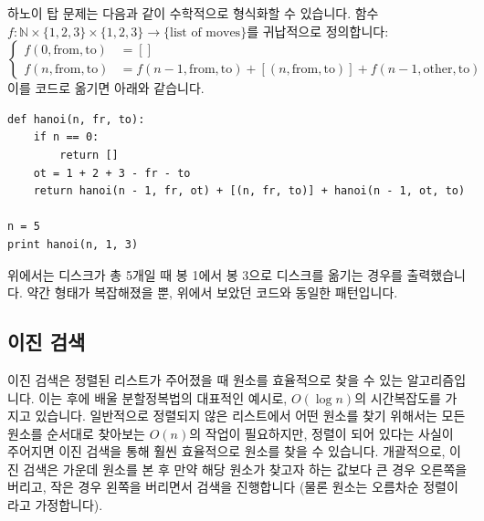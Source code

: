 \documentclass[../main.tex]{subfiles}
\begin{document}
하노이 탑 문제는 다음과 같이 수학적으로 형식화할 수 있습니다.
함수 $f: \mathbb{N} \times \{1, 2, 3\} \times \{1, 2, 3\} \rightarrow \{\text{list of moves}\}$를 귀납적으로 정의합니다:
\[
\begin{cases}f(0, \mathrm{from}, \mathrm{to}) &= []\\
f(n, \mathrm{from}, \mathrm{to}) &= f(n - 1, \mathrm{from}, \mathrm{to}) + [(n, \mathrm{from}, \mathrm{to})] + f(n - 1, \mathrm{other}, \mathrm{to})\end{cases}
\]
이를 코드로 옮기면 아래와 같습니다.
\begin{verbatim}
def hanoi(n, fr, to):
    if n == 0:
        return []
    ot = 1 + 2 + 3 - fr - to
    return hanoi(n - 1, fr, ot) + [(n, fr, to)] + hanoi(n - 1, ot, to)

n = 5
print hanoi(n, 1, 3)
\end{verbatim}
위에서는 디스크가 총 5개일 때 봉 1에서 봉 3으로 디스크를 옮기는 경우를 출력했습니다.
약간 형태가 복잡해졌을 뿐, 위에서 보았던 코드와 동일한 패턴입니다.

\subsection{이진 검색}
이진 검색은 정렬된 리스트가 주어졌을 때 원소를 효율적으로 찾을 수 있는 알고리즘입니다.
이는 후에 배울 분할정복법의 대표적인 예시로, $O(\log n)$의 시간복잡도를 가지고 있습니다.
일반적으로 정렬되지 않은 리스트에서 어떤 원소를 찾기 위해서는 모든 원소를 순서대로 찾아보는 $O(n)$의 작업이 필요하지만, 정렬이 되어 있다는 사실이 주어지면 이진 검색을 통해 훨씬 효율적으로 원소를 찾을 수 있습니다.
개괄적으로, 이진 검색은 가운데 원소를 본 후 만약 해당 원소가 찾고자 하는 값보다 큰 경우 오른쪽을 버리고, 작은 경우 왼쪽을 버리면서 검색을 진행합니다 (물론 원소는 오름차순 정렬이라고 가정합니다).
\end{document}
